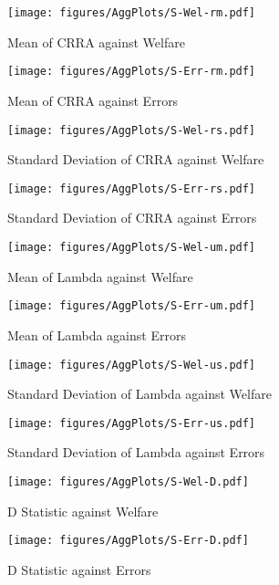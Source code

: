 \documentclass[../main.tex]{subfiles}
\begin{document}
\begin{figure}[hp!]
	\center
	\caption{Mean of CRRA against Welfare}
	\texttt{[image: figures/AggPlots/S-Wel-rm.pdf]}
	\label{fig:S-Wel-rm}
\end{figure}

\begin{figure}[hp!]
	\center
	\caption{Mean of CRRA against Errors}
	\texttt{[image: figures/AggPlots/S-Err-rm.pdf]}
	\label{fig:S-Err-rm}
\end{figure}

\begin{figure}[hp!]
	\center
	\caption{Standard Deviation of CRRA against Welfare}
	\texttt{[image: figures/AggPlots/S-Wel-rs.pdf]}
	\label{fig:S-Wel-rs}
\end{figure}

\begin{figure}[hp!]
	\center
	\caption{Standard Deviation of CRRA against Errors}
	\texttt{[image: figures/AggPlots/S-Err-rs.pdf]}
	\label{fig:S-Err-rs}
\end{figure}

\begin{figure}[hp!]
	\center
	\caption{Mean of Lambda against Welfare}
	\texttt{[image: figures/AggPlots/S-Wel-um.pdf]}
	\label{fig:S-Wel-um}
\end{figure}

\begin{figure}[hp!]
	\center
	\caption{Mean of Lambda against Errors}
	\texttt{[image: figures/AggPlots/S-Err-um.pdf]}
	\label{fig:S-Err-um}
\end{figure}

\begin{figure}[hp!]
	\center
	\caption{Standard Deviation of Lambda against Welfare}
	\texttt{[image: figures/AggPlots/S-Wel-us.pdf]}
	\label{fig:S-Wel-us}
\end{figure}

\begin{figure}[hp!]
	\center
	\caption{Standard Deviation of Lambda against Errors}
	\texttt{[image: figures/AggPlots/S-Err-us.pdf]}
	\label{fig:S-Err-us}
\end{figure}

\begin{figure}[hp!]
	\center
	\caption{D Statistic against Welfare}
	\texttt{[image: figures/AggPlots/S-Wel-D.pdf]}
	\label{fig:D-Wel-smooth}
\end{figure}

\begin{figure}[hp!]
	\center
	\caption{D Statistic against Errors}
	\texttt{[image: figures/AggPlots/S-Err-D.pdf]}
	\label{fig:D-Err-smooth}
\end{figure}

\newpage

\onlyinsubfile{
\newpage
\printbibliography[segment=3, heading=subbibliography]
}
\end{document}
